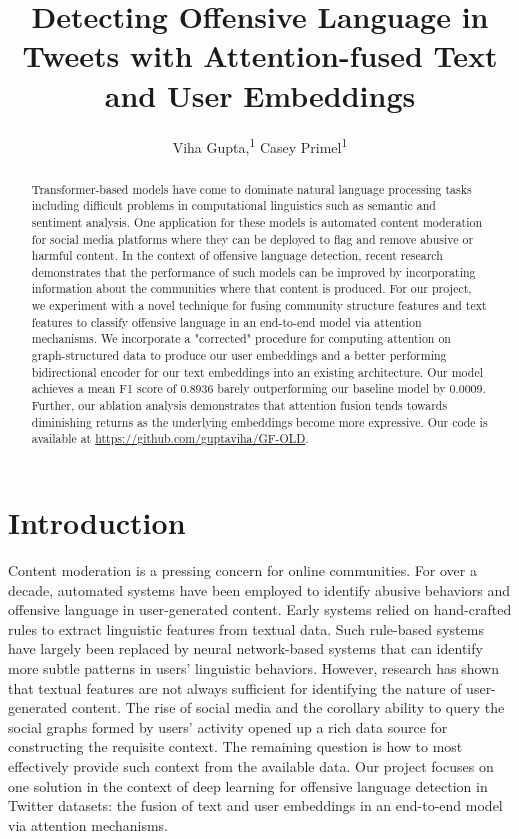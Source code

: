 \documentclass[letterpaper]{article} %
\title{Detecting Offensive Language in Tweets with Attention-fused Text and User Embeddings}
\author {
    Viha Gupta,\textsuperscript{\rm 1}
    Casey Primel\textsuperscript{\rm 1}
}
\begin{document}
\maketitle

\begin{abstract}
    Transformer-based models have come to dominate natural language processing tasks including difficult problems in computational linguistics such as semantic and sentiment analysis. One application for these models is automated content moderation for social media platforms where they can be deployed to flag and remove abusive or harmful content. In the context of offensive language detection, recent research demonstrates that the performance of such models can be improved by incorporating information about the communities where that content is produced. For our project, we experiment with a novel technique for fusing community structure features and text features to classify offensive language in an end-to-end model via attention mechanisms. We incorporate a "corrected" procedure for computing attention on graph-structured data to produce our user embeddings and a better performing bidirectional encoder for our text embeddings into an existing architecture. Our model achieves a mean F1 score of 0.8936 barely outperforming our baseline model by 0.0009. Further, our ablation analysis demonstrates that attention fusion tends towards diminishing returns as the underlying embeddings become more expressive. Our code is available at \url{https://github.com/guptaviha/GF-OLD}.
\end{abstract}

\section{Introduction}

Content moderation is a pressing concern for online communities. For over a decade, automated systems have been employed to identify abusive behaviors and offensive language in user-generated content. Early systems relied on hand-crafted rules to extract linguistic features from textual data. Such rule-based systems have largely been replaced by neural network-based systems that can identify more subtle patterns in users' linguistic behaviors. However, research has shown that textual features are not always sufficient for identifying the nature of user-generated content. The rise of social media and the corollary ability to query the social graphs formed by users' activity opened up a rich data source for constructing the requisite context. The remaining question is how to most effectively provide such context from the available data. Our project focuses on one solution in the context of deep learning for offensive language detection in Twitter datasets: the fusion of text and user embeddings in an end-to-end model via attention mechanisms.
\end{document}
